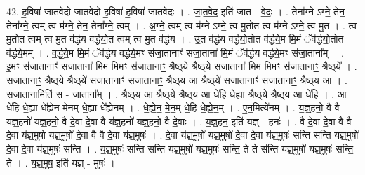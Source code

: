 \documentclass[17pt]{extarticle}
\begin{document}
42. ह॒विषा॑ जातवेदो जातवेदो ह॒विषा॑ ह॒विषा॑ जातवेदः । . जा॒त॒वे॒द॒ इति॑ जात - वे॒दः॒ । . तेना᳚ग्ने ऽग्ने॒ तेन॒ तेना᳚ग्ने॒ त्वम् त्व म॑ग्ने॒ तेन॒ तेना᳚ग्ने॒ त्वम् । . अ॒ग्ने॒ त्वम् त्व म॑ग्ने ऽग्ने॒ त्व मु॒तोत त्व म॑ग्ने ऽग्ने॒ त्व मु॒त । . त्व मु॒तोत त्वम् त्व मु॒त व॑र्द्धय वर्द्धयो॒त त्वम् त्व मु॒त व॑र्द्धय । . उ॒त व॑र्द्धय वर्द्धयो॒तोत व॑र्द्धये॒म मि॒मं ॅव॑र्द्धयो॒तोत व॑र्द्धये॒मम् । . व॒र्द्ध॒ये॒म मि॒मं ॅव॑र्द्धय वर्द्धये॒मꣳ स॑जा॒तानाꣳ॑ सजा॒ताना॑ मि॒मं ॅव॑र्द्धय 
वर्द्धये॒मꣳ स॑जा॒ताना᳚म् । . इ॒मꣳ स॑जा॒तानाꣳ॑ सजा॒ताना॑ मि॒म मि॒मꣳ स॑जा॒तानाꣳ॒॒ श्रैष्ठ्‌ये॒ श्रैष्ठ्‌ये॑ सजा॒ताना॑ मि॒म मि॒मꣳ स॑जा॒तानाꣳ॒॒ श्रैष्ठ्‌ये᳚ । . स॒जा॒तानाꣳ॒॒ श्रैष्ठ्‌ये॒ श्रैष्ठ्‌ये॑ सजा॒तानाꣳ॑ सजा॒तानाꣳ॒॒ श्रैष्ठ्‌य॒ आ श्रैष्ठ्‌ये॑ सजा॒तानाꣳ॑ सजा॒तानाꣳ॒॒ श्रैष्ठ्‌य॒ आ । . स॒जा॒ताना॒मिति॑ स - जा॒ताना᳚म् । . श्रैष्ठ्‌य॒ आ श्रैष्ठ्‌ये॒ श्रैष्ठ्‌य॒ आ धे॑हि धे॒ह्या श्रैष्ठ्‌ये॒ श्रैष्ठ्‌य॒ आ धे॑हि । . आ धे॑हि धे॒ह्या धे᳚ह्येन मेनम् धे॒ह्या धे᳚ह्येनम् । . धे॒ह्ये॒न॒ मे॒न॒म् धे॒हि॒ धे॒ह्ये॒न॒म् । . ए॒न॒मित्ये॑नम् । . य॒ज्ञ्॒हनो॒ वै वै य॑ज्ञ्॒हनो॑ यज्ञ्॒हनो॒ वै दे॒वा दे॒वा वै य॑ज्ञ्॒हनो॑ यज्ञ्॒हनो॒ वै दे॒वाः । . य॒ज्ञ्॒हन॒ इति॑ यज्ञ् - हनः॑ । . वै दे॒वा दे॒वा वै वै दे॒वा य॑ज्ञ्॒मुषो॑ यज्ञ्॒मुषो॑ दे॒वा वै वै दे॒वा य॑ज्ञ्॒मुषः॑ । . दे॒वा य॑ज्ञ्॒मुषो॑ यज्ञ्॒मुषो॑ दे॒वा दे॒वा य॑ज्ञ्॒मुषः॑ सन्ति सन्ति यज्ञ्॒मुषो॑ दे॒वा दे॒वा य॑ज्ञ्॒मुषः॑ सन्ति । . य॒ज्ञ्॒मुषः॑ सन्ति सन्ति यज्ञ्॒मुषो॑ यज्ञ्॒मुषः॑ सन्ति॒ ते ते स॑न्ति यज्ञ्॒मुषो॑ यज्ञ्॒मुषः॑ सन्ति॒ ते । . य॒ज्ञ्॒मुष॒ इति॑ यज्ञ् - मुषः॑ । \newline
\pagebreak
{}
\end{document}
